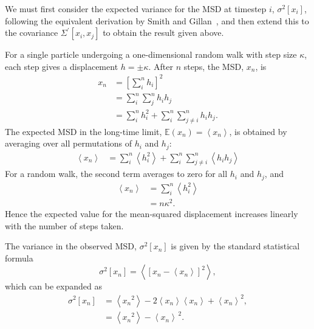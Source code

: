 \documentclass[reprint,superscriptaddress,nobibnotes,amsmath,amssymb,aps,prx,hidelinks]{revtex4-2}
\newcommand{\oMSDi}{\ensuremath{x_i}}
\newcommand{\oMSDj}{\ensuremath{x_j}}
\newcommand{\oMSDn}{\ensuremath{x_n}}
\newcommand{\moMSDn}{\ensuremath{\left<\oMSDn\right>}}
\newcommand{\MSD}[1]{\big\langle\Delta\mathbf{r}{(#1)}^2\big\rangle}
\newcommand{\var}[1]{\ensuremath{\sigma^2[#1]}}
\begin{document}
We must first consider the expected variance for the MSD at timestep $i$, $\var{\oMSDi}$, following the equivalent derivation by Smith and Gillan~\cite{smith_random_1996}, and then extend this to the covariance $\Sigma^\prime\left[\oMSDi, \oMSDj\right]$ to obtain the result given above.

For a single particle undergoing a one-dimensional random walk with step size $\kappa$, each step gives a displacement $h = \pm \kappa$.
After $n$ steps, the MSD, $\oMSDn$, is
%
\begin{equation}
  \begin{aligned}
    \oMSDn &= \left[\sum_i^n h_i\right]^2\\
           &= \sum_i^n\sum_j^n h_i h_j \\
           &= \sum_i^n h_i^2 + \sum_i^n\sum_{j\neq i}^n h_ih_j.
  \end{aligned}
\end{equation}
%
The expected MSD in the long-time limit, $\mathbb{E}(\oMSDn) = \moMSDn$, is obtained by averaging over all permutations of $h_i$ and $h_j$:
%
\begin{equation}
  \begin{aligned}
    \moMSDn &= \sum_i^n \left<h_i^2\right> + \sum_i^n\sum_{j\neq i}^n\left<h_i h_j\right>
  \end{aligned}
\end{equation}
%
For a random walk, the second term averages to zero for all $h_i$ and $h_j$, and
%
\begin{equation}
  \begin{aligned}
    \moMSDn &= \sum_i^n \left<h_i^2\right> \\
            &= n\kappa^2.
  \end{aligned}
  \label{equ:msd_SI}
\end{equation}
%
Hence the expected value for the mean-squared displacement increases linearly with the number of steps taken.

The variance in the observed MSD, $\var{\oMSDn}$ is given by the standard statistical formula
%
\begin{equation}
    \var{\oMSDn} = \left<{\left[\oMSDn - \moMSDn\right]}^2\right>,
\end{equation}
%
which can be expanded as
%
\begin{equation}
    \begin{aligned}
        \var{\oMSDn} &= \left<\oMSDn^2\right> - 2\moMSDn\left<\oMSDn\right> + \moMSDn^2,\\
                     &= \left<\oMSDn^2\right> - \moMSDn^{\,2}.
    \end{aligned}
\end{equation}
%
\end{document}
